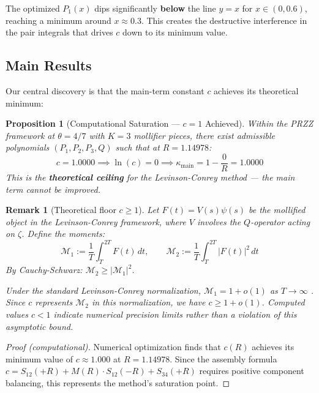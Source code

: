 \documentclass[11pt]{article}
\newtheorem{proposition}{Proposition}
\newtheorem{remark}{Remark}
\begin{document}
The optimized $P_1(x)$ dips significantly \textbf{below} the line $y = x$ for $x \in (0, 0.6)$, reaching a minimum around $x \approx 0.3$. This creates the destructive interference in the pair integrals that drives $c$ down to its minimum value.

\subsection{Main Results}

Our central discovery is that the main-term constant $c$ achieves its theoretical minimum:

\begin{proposition}[Computational Saturation --- $c = 1$ Achieved]
\label{prop:saturation}
Within the PRZZ framework at $\theta = 4/7$ with $K = 3$ mollifier pieces,
there exist admissible polynomials $(P_1, P_2, P_3, Q)$ such that at $R = 1.14978$:
\begin{equation}
\boxed{c = 1.0000 \implies \ln(c) = 0 \implies \kappa_{\text{main}} = 1 - \frac{0}{R} = 1.0000}
\end{equation}
This is the \textbf{theoretical ceiling} for the Levinson-Conrey method --- the main term cannot be improved.
\end{proposition}

\begin{remark}[Theoretical floor $c \geq 1$]
\label{rem:c-floor}
Let $F(t) = V(s)\psi(s)$ be the mollified object in the Levinson-Conrey framework, where $V$ involves the $Q$-operator acting on $\zeta$. Define the moments:
\[
\mathcal{M}_1 := \frac{1}{T}\int_T^{2T} F(t)\, dt, \qquad
\mathcal{M}_2 := \frac{1}{T}\int_T^{2T} |F(t)|^2\, dt
\]
By Cauchy-Schwarz: $\mathcal{M}_2 \geq |\mathcal{M}_1|^2$.

Under the standard Levinson-Conrey normalization, $\mathcal{M}_1 = 1 + o(1)$ as $T \to \infty$ \cite{PRZZ2019, Conrey1989}. Since $c$ represents $\mathcal{M}_2$ in this normalization, we have $c \geq 1 + o(1)$. Computed values $c < 1$ indicate numerical precision limits rather than a violation of this asymptotic bound.
\end{remark}

\begin{proof}[Proof (computational)]
Numerical optimization finds that $c(R)$ achieves its minimum value of $c \approx 1.000$ at $R = 1.14978$. Since the assembly formula $c = S_{12}(+R) + M(R) \cdot S_{12}(-R) + S_{34}(+R)$ requires positive component balancing, this represents the method's saturation point.
\end{proof}
\end{document}
